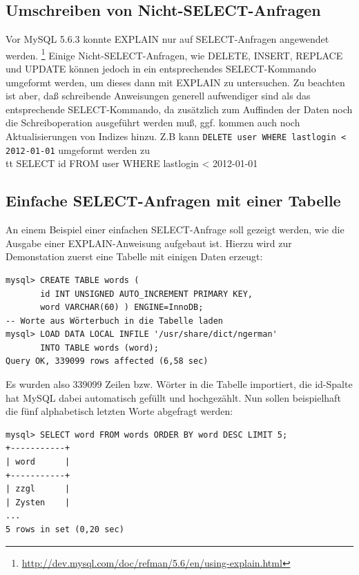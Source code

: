 \subsection{Umschreiben von Nicht-SELECT-Anfragen}
Vor MySQL 5.6.3 konnte EXPLAIN nur auf SELECT-Anfragen angewendet werden. \footnote{\cite{manual} \url{http://dev.mysql.com/doc/refman/5.6/en/using-explain.html}}
Einige Nicht-SELECT-Anfragen, wie DELETE, INSERT, REPLACE und UPDATE können jedoch in ein entsprechendes SELECT-Kommando umgeformt werden, um dieses dann mit EXPLAIN zu untersuchen. Zu beachten ist aber, daß schreibende Anweisungen generell aufwendiger sind als das entsprechende SELECT-Kommando, da zusätzlich zum Auffinden der Daten noch die Schreiboperation ausgeführt werden muß, ggf. kommen auch noch Aktualisierungen von Indizes hinzu. Z.B  kann {\tt DELETE user WHERE lastlogin < 2012-01-01} umgeformt werden zu {\\tt SELECT id FROM user WHERE lastlogin < 2012-01-01}

\subsection{Einfache SELECT-Anfragen mit einer Tabelle}
An einem Beispiel einer einfachen SELECT-Anfrage soll gezeigt werden, wie die Ausgabe einer EXPLAIN-Anweisung aufgebaut ist.
Hierzu wird zur Demonstation zuerst eine Tabelle mit einigen Daten erzeugt:
\begin{lstlisting}[caption=Anlegen einer Tabelle mit Wörtern]
mysql> CREATE TABLE words ( 
       id INT UNSIGNED AUTO_INCREMENT PRIMARY KEY, 
       word VARCHAR(60) ) ENGINE=InnoDB; 
-- Worte aus Wörterbuch in die Tabelle laden
mysql> LOAD DATA LOCAL INFILE '/usr/share/dict/ngerman'
       INTO TABLE words (word);
Query OK, 339099 rows affected (6,58 sec)
\end{lstlisting}
Es wurden also 339099 Zeilen bzw. Wörter in die Tabelle importiert, die id-Spalte hat MySQL dabei automatisch gefüllt und hochgezählt.
Nun sollen beispielhaft die fünf alphabetisch letzten Worte abgefragt werden:\\
\begin{minipage}{\linewidth}
\begin{lstlisting}[caption=Einfaches SELECT ohne Indexzugriff]
mysql> SELECT word FROM words ORDER BY word DESC LIMIT 5;
+-----------+
| word      |
+-----------+
| zzgl      |
| Zysten    |
...
5 rows in set (0,20 sec)
\end{lstlisting}
\end{minipage}


